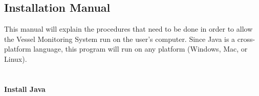 \documentclass{article}
\begin{document}

{\color{royalblue}\subsection{Installation Manual}}

This manual will explain the procedures that need to be done in order to allow the Vessel Monitoring System run on the user's computer. Since Java is a cross-platform language, this program will run on any platform (Windows, Mac, or Linux).

\paragraph{\\ Install Java}
\end{document}
